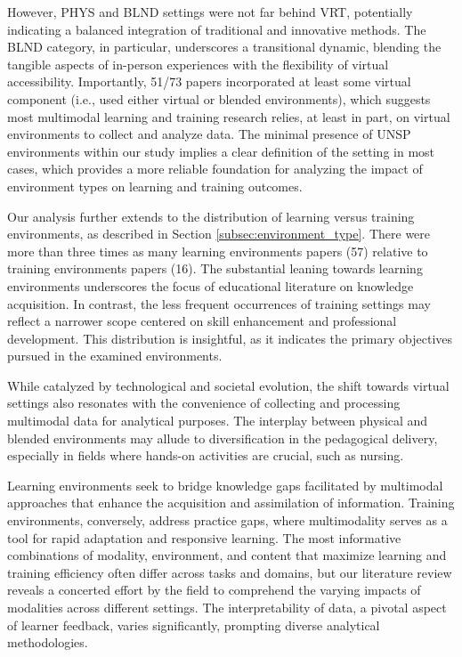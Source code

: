 \documentclass[manuscript,screen,review]{acmart}
\begin{document}
However, PHYS and BLND settings were not far behind VRT, potentially indicating a balanced integration of traditional and innovative methods. The BLND category, in particular, underscores a transitional dynamic, blending the tangible aspects of in-person experiences with the flexibility of virtual accessibility. Importantly, 51/73 papers incorporated at least some virtual component (i.e., used either virtual or blended environments), which suggests most multimodal learning and training research relies, at least in part, on virtual environments to collect and analyze data. The minimal presence of UNSP environments within our study implies a clear definition of the setting in most cases, which provides a more reliable foundation for analyzing the impact of environment types on learning and training outcomes.

Our analysis further extends to the distribution of learning versus training environments, as described in Section \ref{subsec:environment_type}. There were more than three times as many learning environments papers (57) relative to training environments papers (16). The substantial leaning towards learning environments underscores the focus of educational literature on knowledge acquisition. In contrast, the less frequent occurrences of training settings may reflect a narrower scope centered on skill enhancement and professional development. This distribution is insightful, as it indicates the primary objectives pursued in the examined environments.

While catalyzed by technological and societal evolution, the shift towards virtual settings also resonates with the convenience of collecting and processing multimodal data for analytical purposes. The interplay between physical and blended environments may allude to diversification in the pedagogical delivery, especially in fields where hands-on activities are crucial, such as nursing.

Learning environments seek to bridge knowledge gaps facilitated by multimodal approaches that enhance the acquisition and assimilation of information. Training environments, conversely, address practice gaps, where multimodality serves as a tool for rapid adaptation and responsive learning. The most informative combinations of modality, environment, and content that maximize learning and training efficiency often differ across tasks and domains, but our literature review reveals a concerted effort by the field to comprehend the varying impacts of modalities across different settings. The interpretability of data, a pivotal aspect of learner feedback, varies significantly, prompting diverse analytical methodologies.
\end{document}
